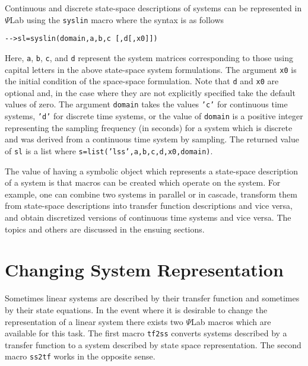 	Continuous and discrete state-space descriptions of systems
can be represented in $\Psi$Lab using the {\tt syslin} macro where
the syntax is as follows
\begin{verbatim}
-->sl=syslin(domain,a,b,c [,d[,x0]])
\end{verbatim}
Here, {\tt a}, {\tt b}, {\tt c}, and {\tt d} represent the system
matrices corresponding to those using capital letters in the above
state-space system formulations.  The argument {\tt x0} is the initial
condition of the space-space formulation.  Note that {\tt d} and
{\tt x0} are optional and, in the case where they are not explicitly
specified take the default values of zero.  The argument {\tt domain} takes
the values {\tt 'c'} for continuous time systems, {\tt 'd'} for 
discrete time systems, or the value of {\tt domain} is a positive 
integer representing the sampling frequency (in seconds) for a system
which is discrete and was derived from a continuous time system by
sampling.  The returned value of {\tt sl} is a list where
{\tt s=list('lss',a,b,c,d,x0,domain)}.

	The value of having a symbolic object which represents
a state-space description of a system is that macros can be created
which operate on the system.  For example, one can combine two systems
in parallel or in cascade, transform them from state-space descriptions
into transfer function descriptions and vice versa, and obtain
discretized versions of continuous time systems and vice versa.
The topics and others are discussed in the ensuing sections.

\section{Changing System Representation}

	Sometimes linear systems are described by their transfer function
and sometimes by their state equations.  In the event where it is
desirable to change the representation of a linear system there exists two
$\Psi$Lab macros which are available for this task.  The first macro
{\tt tf2ss} converts systems described by a transfer function
to a system described by state space representation.  The second
macro {\tt ss2tf} works in the opposite sense.

